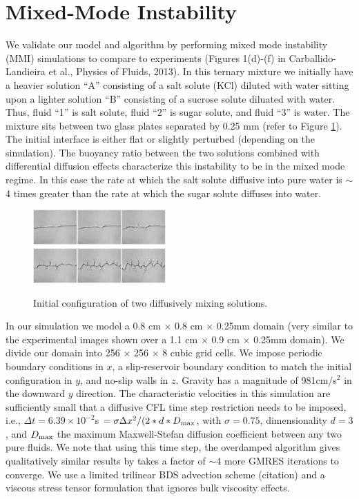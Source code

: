 \documentclass[final]{siamltex}
\begin{document}
\section{Mixed-Mode Instability}
We validate our model and algorithm by performing mixed mode instability (MMI) simulations to compare to experiments 
(Figures 1(d)-(f) in Carballido-Landieira et al., Physics of Fluids, 2013).  In this ternary mixture
we initially have a heavier solution ``A'' consisting of a salt solute (KCl) diluted with water sitting upon
a lighter solution ``B'' consisting of a sucrose solute diluated with water.  
Thus, fluid ``1'' is salt solute, fluid ``2'' is sugar solute, and fluid ``3'' is water.
The mixture sits between two glass plates separated by 0.25 mm (refer to Figure \ref{fig:mmi}).
The initial interface is either flat or slightly perturbed (depending
on the simulation).  The buoyancy ratio between the two solutions combined with 
differential diffusion effects characterize this instability to be in the mixed mode
regime.  In this case the rate at which the salt solute diffusive into pure water is $\sim$4 times greater 
than the rate at which the sugar solute diffuses into water.
\begin{figure}[hb]
\centering
\includegraphics[width=2in]{mmi}
\label{fig:mmi}
\caption{Initial configuration of two diffusively mixing solutions.}
\end{figure}

In our simulation we model a 0.8 cm $\times$ 0.8 cm $\times$ 0.25mm domain (very similar to the experimental
images shown over a 1.1 cm $\times$ 0.9 cm $\times$ 0.25mm domain).  We divide our domain into 
256 $\times$ 256 $\times$ 8 cubic grid cells.  We impose periodic boundary conditions in $x$,
a slip-reservoir boundary condition to match the initial configuration in $y$, and no-slip walls in $z$.
Gravity has a magnitude of 981cm/s$^2$ in the downward $y$ direction.  The characteristic velocities in
this simulation are sufficiently small that a diffusive CFL time step restriction needs to be imposed, i.e.,
$\Delta t = 6.39 \times 10^{-2}$s $= \sigma\Delta x^2/(2*d*D_{\rm max}$, with $\sigma=0.75$, 
dimensionality $d=3$, and $D_{\rm max}$ the maximum Maxwell-Stefan diffusion coefficient between any two pure
fluids.  We note that using this time step, the overdamped algorithm gives qualitatively
similar results by takes a factor of $\sim$4 more GMRES iterations to converge.  We use a limited trilinear
BDS advection scheme (citation) and a viscous stress tensor formulation that ignores bulk viscosity effects.
\end{document}
